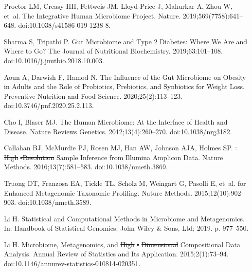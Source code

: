 \documentclass[10pt,letterpaper]{article}
\providecommand{\DIFaddtex}[1]{{\protect\color{blue}\uwave{#1}}} %
\providecommand{\DIFdeltex}[1]{{\protect\color{red}\sout{#1}}}                      %
\providecommand{\DIFaddbegin}{} %
\providecommand{\DIFaddend}{} %
\providecommand{\DIFdelbegin}{} %
\providecommand{\DIFdelend}{} %
\providecommand{\DIFadd}[1]{\texorpdfstring{\DIFaddtex{#1}}{#1}} %
\providecommand{\DIFdel}[1]{\texorpdfstring{\DIFdeltex{#1}}{}} %
\newcommand{\DIFscaledelfig}{0.5}
\newlength{\DIFdelgraphicswidth} %
\newlength{\DIFdelgraphicsheight} %
\newcommand{\DIFaddincludegraphics}[2][]{{\color{blue}\fbox{\DIFOincludegraphics[#1]{#2}}}} %
\newcommand{\DIFdelincludegraphics}[2][]{%
\sbox{\DIFdelgraphicsbox}{\DIFOincludegraphics[#1]{#2}}%
\settoboxwidth{\DIFdelgraphicswidth}{\DIFdelgraphicsbox} %
\settoboxtotalheight{\DIFdelgraphicsheight}{\DIFdelgraphicsbox} %
\scalebox{\DIFscaledelfig}{%
\parbox[b]{\DIFdelgraphicswidth}{\usebox{\DIFdelgraphicsbox}\\[-\baselineskip] \rule{\DIFdelgraphicswidth}{0em}}\llap{\resizebox{\DIFdelgraphicswidth}{\DIFdelgraphicsheight}{%
\setlength{\unitlength}{\DIFdelgraphicswidth}%
\begin{picture}(1,1)%
\thicklines\linethickness{2pt} %
{\color[rgb]{1,0,0}\put(0,0){\framebox(1,1){}}}%
{\color[rgb]{1,0,0}\put(0,0){\line( 1,1){1}}}%
{\color[rgb]{1,0,0}\put(0,1){\line(1,-1){1}}}%
\end{picture}%
}\hspace*{3pt}}} %
} %
\DeclareRobustCommand{\DIFaddbegin}{\DIFOaddbegin \let\includegraphics\DIFaddincludegraphics} %
\DeclareRobustCommand{\DIFaddend}{\DIFOaddend \let\includegraphics\DIFOincludegraphics} %
\DeclareRobustCommand{\DIFdelbegin}{\DIFOdelbegin \let\includegraphics\DIFdelincludegraphics} %
\DeclareRobustCommand{\DIFdelend}{\DIFOaddend \let\includegraphics\DIFOincludegraphics} %
\begin{document}
\DIFdelend %
\begin{thebibliography}{10}

Proctor LM, Creasy HH, Fettweis JM, {Lloyd-Price} J, Mahurkar A, Zhou W, et~al.
\newblock The {{Integrative Human Microbiome Project}}.
\newblock Nature. 2019;569(7758):641--648.
\newblock doi:{10.1038/s41586-019-1238-8}.

\DIFdelbegin {}
\DIFdelend \DIFaddbegin {}
\DIFaddend Sharma S, Tripathi P.
\newblock Gut Microbiome and Type 2 Diabetes: Where We Are and Where to Go?
\newblock The Journal of Nutritional Biochemistry. 2019;63:101--108.
\newblock doi:{10.1016/j.jnutbio.2018.10.003}.

Aoun A, Darwish F, Hamod N.
\newblock The {{Influence}} of the {{Gut Microbiome}} on {{Obesity}} in
  {{Adults}} and the {{Role}} of {{Probiotics}}, {{Prebiotics}}, and
  {{Synbiotics}} for {{Weight Loss}}.
\newblock Preventive Nutrition and Food Science. 2020;25(2):113--123.
\newblock doi:{10.3746/pnf.2020.25.2.113}.

Cho I, Blaser MJ.
\newblock The Human Microbiome: At the Interface of Health and Disease.
\newblock Nature Reviews Genetics. 2012;13(4):260--270.
\newblock doi:{10.1038/nrg3182}.

Callahan BJ, McMurdie PJ, Rosen MJ, Han AW, Johnson AJA, Holmes SP.
: {{\DIFdelbegin \DIFdel{High}\DIFdelend \DIFaddbegin \DIFadd{High-resolution}\DIFaddend }} \DIFdelbegin \DIFdel{-Resolution }\DIFdelend Sample Inference from {{Illumina}}
  Amplicon Data.
\newblock Nature Methods. 2016;13(7):581--583.
\newblock doi:{10.1038/nmeth.3869}.

Truong DT, Franzosa EA, Tickle TL, Scholz M, Weingart G, Pasolli E, et~al.
 for Enhanced Metagenomic Taxonomic Profiling.
\newblock Nature Methods. 2015;12(10):902--903.
\newblock doi:{10.1038/nmeth.3589}.

\DIFdelbegin {}
\DIFdelend \DIFaddbegin {}
\DIFaddend Li H.
\newblock Statistical and {{Computational Methods}} in {{Microbiome}} and
  {{Metagenomics}}.
\newblock In: Handbook of {{Statistical Genomics}}. {John Wiley \& Sons, Ltd};
  2019. p. 977--550.

Li H.
\newblock Microbiome, {{Metagenomics}}, and {{\DIFdelbegin \DIFdel{High}%
\DIFdel{-}%
\DIFdel{Dimensional
  }\DIFdelend \DIFaddbegin \DIFadd{High-Dimensional }\DIFaddend Compositional
  Data Analysis}}.
\newblock Annual Review of Statistics and Its Application. 2015;2(1):73--94.
\newblock doi:{10.1146/annurev-statistics-010814-020351}.


\end{thebibliography}
\end{document}
